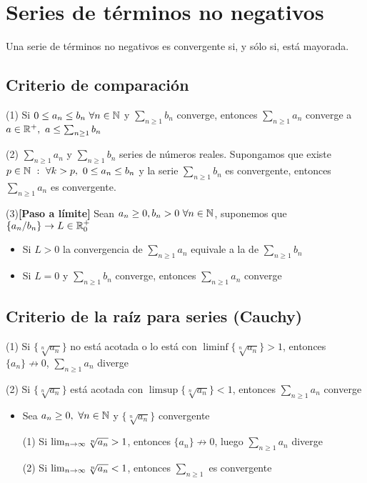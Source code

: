 \section{Series de términos no negativos}
Una serie de términos no negativos es convergente si, y sólo si, está mayorada.

\subsection{Criterio de comparación}
(1) Si $0\leq a_n\leq b_n \ \forall n\in\mathbb{N}$ y $\sum_{n\geq 1} b_n$ converge, entonces $\sum_{n\geq 1} a_n$ converge a $a\in\mathbb{R}^+, \ a\leq \sum_{n\geq 1}b_n$

(2) $\sum_{n\geq 1}a_n$ y $\sum_{n\geq 1}b_n$ series de números reales. Supongamos que existe $p\in\mathbb{N} \ : \ \forall k>p, \ 0\leq a_n\leq b_n$ y la serie $\sum_{n\geq 1} b_n$ es convergente, entonces $\sum_{n\geq 1} a_n$ es convergente.

(3)\textbf{[Paso a límite]} 
Sean $a_n\geq0,b_n>0 \ \forall n\in\mathbb{N}$, suponemos que $\{a_n/b_n\}\rightarrow L\in\mathbb{R}^+_0$
\begin{itemize}
	\item Si $L>0$ la convergencia de $\sum_{n\geq 1}a_n$ equivale a la de $\sum_{n\geq 1}b_n$
	\item Si $L=0$ y $\sum_{n\geq 1}b_n$ converge, entonces $\sum_{n\geq 1}a_n$ converge
\end{itemize} 

\subsection{Criterio de la raíz para series (Cauchy)}
(1) Si $\{\sqrt[n]{a_n}\}$ no está acotada o lo está con $\liminf \{\sqrt[n]{a_n}\} > 1$, entonces $\{a_n\} \not\rightarrow 0$, $\sum_{n\geq 1}a_n$ diverge

(2) Si $\{\sqrt[n]{a_n}\}$ está acotada con $\limsup \{\sqrt[n]{a_n}\} < 1$, entonces $\sum_{n\geq 1}a_n$ converge

\begin{itemize}
	\item Sea $a_n\geq 0, \ \forall n\in\mathbb{N}$ y $\{\sqrt[n]{a_n}\}$ convergente
	
	(1) Si $\lim_{\substack{n\rightarrow\infty}} \sqrt[n]{a_n} > 1$, entonces $\{a_n\} \not\rightarrow 0$, luego $\sum_{n\geq 1} a_n$ diverge
	
	(2) Si $\lim_{\substack{n\rightarrow\infty}} \sqrt[n]{a_n} < 1$, entonces $\sum_{n\geq 1}$ es convergente
\end{itemize}

